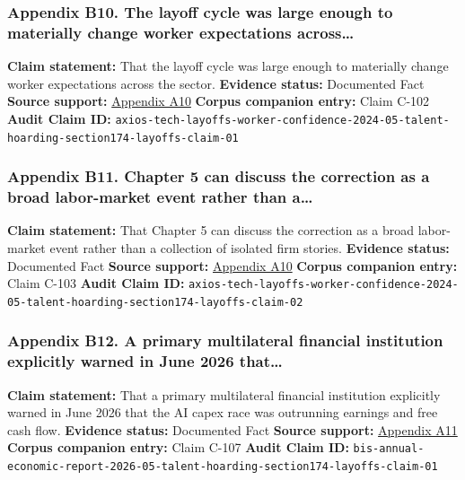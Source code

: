 \documentclass[
  american,
  11pt,
  letterpaper,
]{article}
\begin{document}
\subsubsection{Appendix B10. The layoff cycle was large enough to
materially change worker expectations
across\ldots{}}\label{ch-05-appendix-b10-the-layoff-cycle-was-large-enough-to-materially-change-worker-expectations-across}

\textbf{Claim statement:} That the layoff cycle was large enough to
materially change worker expectations across the sector.
\textbf{Evidence status:} Documented Fact \textbf{Source support:}
\hyperref[ch-05-appendix-a10-big-tech-layoffs-shattered-industry-worker-confidence]{Appendix
A10} \textbf{Corpus companion entry:} Claim C-102 \textbf{Audit Claim
ID:}
\texttt{axios-tech-layoffs-worker-confidence-2024-05-talent-hoarding-section174-layoffs-claim-01}

\subsubsection{Appendix B11. Chapter 5 can discuss the correction as a
broad labor-market event rather than
a\ldots{}}\label{ch-05-appendix-b11-chapter-5-can-discuss-the-correction-as-a-broad-labor-market-event-rather-than-a}

\textbf{Claim statement:} That Chapter 5 can discuss the correction as a
broad labor-market event rather than a collection of isolated firm
stories. \textbf{Evidence status:} Documented Fact \textbf{Source
support:}
\hyperref[ch-05-appendix-a10-big-tech-layoffs-shattered-industry-worker-confidence]{Appendix
A10} \textbf{Corpus companion entry:} Claim C-103 \textbf{Audit Claim
ID:}
\texttt{axios-tech-layoffs-worker-confidence-2024-05-talent-hoarding-section174-layoffs-claim-02}

\subsubsection{Appendix B12. A primary multilateral financial
institution explicitly warned in June 2026
that\ldots{}}\label{ch-05-appendix-b12-a-primary-multilateral-financial-institution-explicitly-warned-in-june-2026-that}

\textbf{Claim statement:} That a primary multilateral financial
institution explicitly warned in June 2026 that the AI capex race was
outrunning earnings and free cash flow. \textbf{Evidence status:}
Documented Fact \textbf{Source support:}
\hyperref[ch-05-appendix-a11-annual-economic-report-2026]{Appendix A11}
\textbf{Corpus companion entry:} Claim C-107 \textbf{Audit Claim ID:}
\texttt{bis-annual-economic-report-2026-05-talent-hoarding-section174-layoffs-claim-01}
\end{document}
